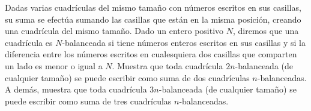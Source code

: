 Dadas varias cuadrículas del mismo tamaño con números escritos en sus casillas, su suma se efectúa sumando las casillas que están en la misma posición, creando una cuadrícula del mismo tamaño.
Dado un entero positivo $N$, diremos que una cuadrícula es $N$-balanceada si tiene números enteros escritos en sus casillas y si la diferencia entre los números escritos en cualesquiera dos casillas que comparten un lado es menor o igual a $N$. Muestra que toda cuadrícula $2n$-balanceada (de cualquier tamaño) se puede escribir como suma de dos cuadrículas $n$-balanceadas. A demás, muestra que toda cuadrícula $3n$-balanceada (de cualquier tamaño) se puede escribir como suma de tres cuadrículas $n$-balanceadas.